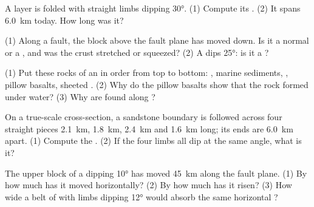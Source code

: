 \begin{exercise}[$\star$]\label{exo:g12:mountain-building:3}
A layer is folded with straight limbs dipping \ang{30}. (1) Compute its
. (2) It spans \qty{6.0}{km} today. How long was it?
\end{exercise}

\begin{exercise}[$\star$]\label{exo:g12:mountain-building:4}
(1) Along a fault, the block above the fault plane has moved down. Is it a
normal or a , and was the crust stretched or squeezed?
(2) A  dips \ang{25}: is it a ?
\end{exercise}

\begin{exercise}[$\star$]\label{exo:g12:mountain-building:5}
(1) Put these rocks of an  in order from top to bottom: ,
marine sediments, , pillow basalts, sheeted . (2) Why do the
pillow basalts show that the rock formed under water? (3) Why are
 found along ?
\end{exercise}

\begin{exercise}[$\star\star$]\label{exo:g12:mountain-building:6}
On a true-scale cross-section, a sandstone boundary is followed across four
straight pieces \qty{2.1}{km}, \qty{1.8}{km}, \qty{2.4}{km} and
\qty{1.6}{km} long; its ends are \qty{6.0}{km} apart. (1) Compute the
. (2) If the four limbs all dip at the same angle, what is it?
\end{exercise}

\begin{exercise}[$\star\star$]\label{exo:g12:mountain-building:7}
The upper block of a  dipping \ang{10} has moved \qty{45}{km} along the
fault plane. (1) By how much has it moved horizontally? (2) By how much has
it risen? (3) How wide a belt of  with limbs dipping \ang{12} would
absorb the same horizontal ?
\end{exercise}

